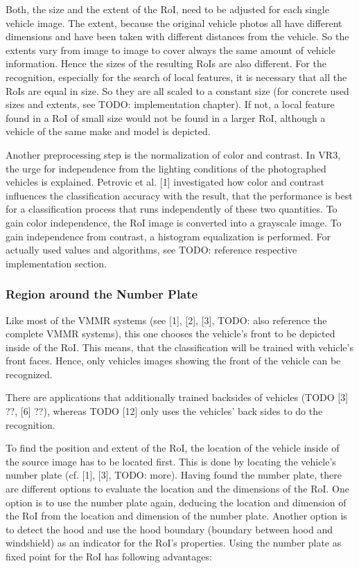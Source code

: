 Both, the size and the extent of the RoI, need to be adjusted for each single vehicle image. The extent, because the original vehicle photos all have different dimensions and have been taken with different distances from the vehicle. So the extents vary from image to image to cover always the same amount of vehicle information. Hence the sizes of the resulting RoIs are also different. For the recognition, especially for the search of local features, it is necessary that all the RoIs are equal in size. So they are all scaled to a constant size (for concrete used sizes and extents, see TODO: implementation chapter). If not, a local feature found in a RoI of small size would not be found in a larger RoI, although a vehicle of the same make and model is depicted.

Another preprocessing step is the normalization of color and contrast. In VR3, the urge for independence from the lighting conditions of the photographed vehicles is explained. Petrovic et al. [1] investigated how color and contrast influences the classification accuracy with the result, that the performance is best for a classification process that runs independently of these two quantities. To gain color independence, the RoI image is converted into a grayscale image. To gain independence from contrast, a histogram equalization is performed. For actually used values and algorithms, see TODO: reference respective implementation section.

\subsubsection{Region around the Number Plate}\label{sec:regionAroundNumberPlate}
Like most of the VMMR systems (see [1], [2], [3], TODO: also reference the complete VMMR systems), this one chooses the vehicle’s front to be depicted inside of the RoI. This means, that the classification will be trained with vehicle’s front faces. Hence, only vehicles images showing the front of the vehicle can be recognized.

There are applications that additionally trained backsides of vehicles (TODO [3] ??, [6] ??), whereas TODO [12] only uses the vehicles’ back sides to do the recognition.

To find the position and extent of the RoI, the location of the vehicle inside of the source image has to be located first. This is done by locating the vehicle’s number plate (cf. [1], [3], TODO: more). Having found the number plate, there are different options to evaluate the location and the dimensions of the RoI. One option is to use the number plate again, deducing the location and dimension of the RoI from the location and dimension of the number plate. Another option is to detect the hood and use the hood boundary (boundary between hood and windshield) as an indicator for the RoI’s properties. Using the number plate as fixed point for the RoI has following advantages:

